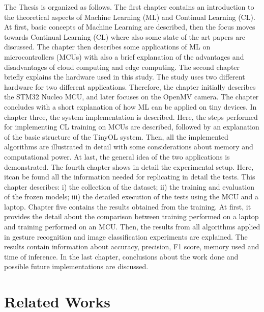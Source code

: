 \documentclass[12pt]{report}
\begin{document}
The Thesis is organized as follows. The first chapter contains an introduction to the theoretical aspects of Machine Learning (ML) and Continual Learning (CL). At first, basic concepts of Machine Learning are described, then the focus moves towards Continual Learning (CL) where also some state of the art papers are discussed. The chapter then describes some applications of ML on microcontrollers (MCUs) with also a brief explanation of the advantages and disadvantages of cloud computing and edge computing. The second chapter briefly explains the hardware used in this study. The study uses two different hardware for two different applications. Therefore, the chapter initially describes the STM32 Nucleo MCU, and later focuses on the OpenMV camera. The chapter concludes with a short explanation of how ML can be applied on tiny devices. In chapter three, the system implementation is described. Here, the steps performed for implementing CL training on MCUs are described, followed by an explanation of the basic structure of the TinyOL system. Then, all the implemented algorithms are illustrated in detail with some considerations about memory and computational power. At last, the general idea of the two applications is demonstrated. The fourth chapter shows in detail the experimental setup. Here, itcan be found all the information needed for replicating in detail the tests. This chapter describes: i) the collection of the dataset; ii) the training and evaluation of the frozen models; iii) the detailed execution of the tests using the MCU and a laptop. Chapter five contains the results obtained from the training. At first, it provides the detail about the comparison between training performed on a laptop and training performed on an MCU. Then, the results from all algorithms applied in gesture recognition and image classification experiments are explained. The results contain information about accuracy, precision, F1 score, memory used and time of inference. In the last chapter, conclusions about the work done and possible future implementations are discussed.


\chapter{Related Works} \label{chap:relworks}
\end{document}
